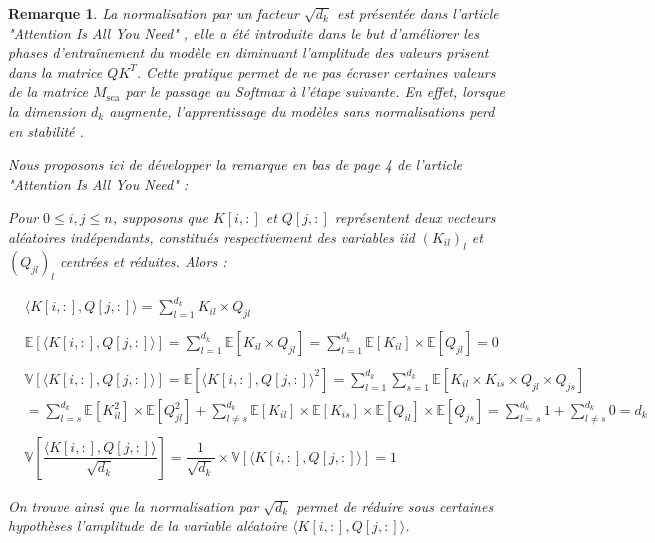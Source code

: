 \documentclass[12pt]{article}
\newtheorem{rmq}{Remarque}
\theoremstyle{definition}
\begin{document}
\begin{rmq}
	La normalisation par un facteur \(\sqrt{d_k}\) est présentée dans l'article \textit{"Attention Is All You Need}" \cite{a_i_a_y_n}, elle a été introduite dans le but d'améliorer les phases d'entraînement du modèle en diminuant l'amplitude des valeurs prisent dans la matrice \(QK^T\). Cette pratique permet de ne pas écraser certaines valeurs de la matrice \(M_{\text{sca}}\) par le passage au Softmax à l'étape suivante. En effet, lorsque la dimension $d_k$ augmente, l'apprentissage du modèles sans normalisations perd en stabilité \cite{a_i_a_y_n}. 
	
	Nous proposons ici de développer la remarque en bas de page 4 de l'article \textit{"Attention Is All You Need}" \cite{a_i_a_y_n} : 
	
	Pour $0\leq i,j \leq n$, supposons que $K[i,:]$ et $Q[j,:]$ représentent deux vecteurs aléatoires indépendants, constitués respectivement des variables iid $(K_{il})_l$ et $(Q_{jl})_l$ centrées et réduites. Alors : 
	

	\begin{align*}
		&\langle K[i,:] , Q[j,:]\rangle = \sum_{l=1}^{d_k} K_{il} \times Q_{jl}\\\\
		&\mathbb{E}\left[\langle K[i,:] , Q[j,:]\rangle\right] = \sum_{l=1}^{d_k} \mathbb{E}\left[K_{il} \times Q_{jl}\right] = \sum_{l=1}^{d_k} \mathbb{E}\left[K_{il} \right] \times \mathbb{E}\left[ Q_{jl}\right] = 0\\\\
		&\mathbb{V}\left[\langle K[i,:] , Q[j,:]\rangle\right] = \mathbb{E}\left[\langle K[i,:] , Q[j,:]\rangle^2\right] = \sum_{l=1}^{d_k}\sum_{s=1}^{d_k} \mathbb{E}\left[K_{il} \times K_{is} \times Q_{jl}\times Q_{js}\right] \\
		& = \sum_{l=s}^{d_k} \mathbb{E}\left[K_{il}^2 \right] \times \mathbb{E}\left[ Q_{jl}^2\right] +  \sum_{l\neq s}^{d_k} \mathbb{E}\left[K_{il}\right] \times \mathbb{E}\left[K_{is}\right]\times \mathbb{E}\left[Q_{il}\right]\times \mathbb{E}\left[ Q_{js}\right] = \sum_{l=s}^{d_k} 1 +  \sum_{l\neq s}^{d_k} 0 = d_k\\ \\
		&\mathbb{V}\left[\dfrac{\langle K[i,:] , Q[j,:]\rangle}{\sqrt{d_k}}\right] = \dfrac{1}{\sqrt{d_k}} \times \mathbb{V}\left[\langle K[i,:] , Q[j,:]\rangle\right] = 1
	\end{align*}


On trouve ainsi que la normalisation par $\sqrt{d_k}$ permet de réduire sous certaines hypothèses l'amplitude de la variable aléatoire $\langle K[i,:] , Q[j,:]\rangle$. \\[1cm]


\end{rmq}
\end{document}
